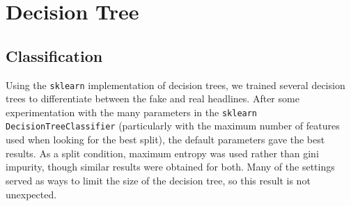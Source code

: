 \documentclass{article}
\begin{document}
   \section{Decision Tree}
   \subsection{Classification}
   Using the \texttt{sklearn} implementation of decision trees, we trained several decision trees
   to differentiate between the fake and real headlines. After some experimentation with the many parameters
   in the \texttt{sklearn DecisionTreeClassifier} (particularly with the maximum number of features used
   when looking for the best split), the default parameters gave the best results. As a split condition,
   maximum entropy was used rather than gini impurity, though similar results were obtained for both.
   Many of the settings served as ways to limit the size of the decision tree, so this result is not unexpected.
\end{document}
